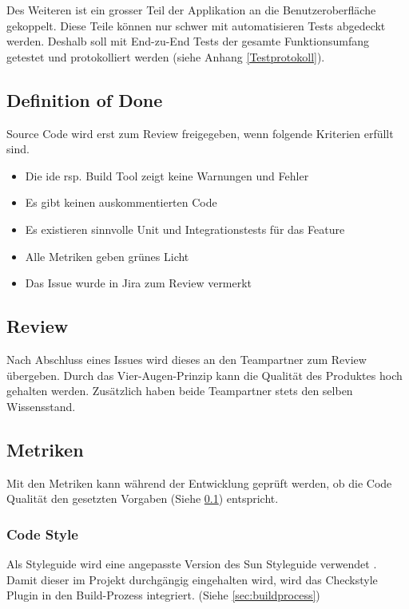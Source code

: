 \documentclass[11pt,a4paper,english,oneside]{book}
\numberwithin{equation}{chapter}
\begin{document}
	Des Weiteren ist ein grosser Teil der Applikation an die Benutzeroberfläche gekoppelt. Diese Teile können nur schwer mit automatisieren Tests abgedeckt werden. Deshalb soll mit End-zu-End Tests der gesamte Funktionsumfang getestet und protokolliert werden (siehe Anhang \ref{Testprotokoll}).
	
	\subsection{Definition of Done} \label{ssec:dod}
	Source Code wird erst zum Review freigegeben, wenn folgende Kriterien erfüllt sind.
	\begin{itemize}
		\item Die \gls{ide} rsp. Build Tool zeigt keine Warnungen und Fehler
		\item Es gibt keinen auskommentierten Code
		\item Es existieren sinnvolle Unit und Integrationstests für das Feature
		\item Alle Metriken geben grünes Licht
		\item Das Issue wurde in Jira \cite{jira} zum Review vermerkt
	\end{itemize}
	
	\subsection{Review}
	Nach Abschluss eines Issues wird dieses an den Teampartner zum Review übergeben. Durch das Vier-Augen-Prinzip kann die Qualität des Produktes hoch gehalten werden. Zusätzlich haben beide Teampartner stets den selben Wissensstand.
	
	\subsection{Metriken} \label{ssec:metriken}
	Mit den Metriken kann während der Entwicklung geprüft werden, ob die Code Qualität den gesetzten Vorgaben (Siehe \ref{ssec:dod}) entspricht.
	
	\subsubsection{Code Style}
	Als Styleguide wird eine angepasste Version des Sun Styleguide verwendet \cite{suncheckstyle}. Damit dieser im Projekt durchgängig eingehalten wird, wird das Checkstyle Plugin \cite{checkstyle} in den Build-Prozess integriert. (Siehe \ref{sec:buildprocess})	
	
\end{document}
